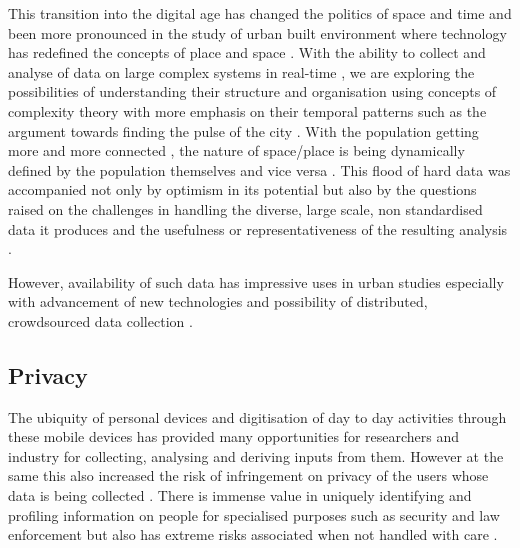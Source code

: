 This transition into the digital age \citep{graham1999, tranos2012, tranos2013} has changed the politics of space and time \citep{massey1992} and been more pronounced in the study of urban built environment where technology has redefined the concepts of place and space \citep{graham2001, graham2002, sassen2001}.
With the ability to collect and analyse of data on large complex systems in real-time \citep{graham1997}, we are exploring the possibilities of understanding their structure and organisation using concepts of complexity theory \citep{bettencourt2013, portugali2012} with more emphasis on their temporal patterns such as the argument towards finding the pulse of the city \citep{batty2010}.
With the population getting more and more connected \citep{castells2010}, the nature of space/place is being dynamically defined by the population themselves \citep{giuliano1991} and vice versa \citep{zandvliet2006}.
This flood of hard data \cite{nature2008} was accompanied not only by optimism in its potential \citep{thomas2001} but also by the questions raised on the challenges in handling the diverse, large scale, non standardised data it produces and the usefulness or representativeness of the resulting analysis \citep{miller2010, arribas-bel2014a}.

However, availability of such data has impressive uses in urban studies \citep{bettencourt2014} especially with advancement of new technologies \citep{steenbruggen2015} and possibility of distributed, crowdsourced data collection \citep{lokanathan2015}.

\subsection{Privacy}

The ubiquity of personal devices and digitisation of day to day activities through these mobile devices \citep{mcmeel2018dark} has provided many opportunities for researchers and industry for collecting, analysing and deriving inputs from them.
However at the same this also increased the risk of infringement on privacy of the users whose data is being collected \cite{saponas2007, krumm2009}.
There is immense value in uniquely identifying and profiling information on people for specialised purposes such as security \citep{cutter2006} and law enforcement \citep{dobson2003} but also has extreme risks associated when not handled with care \citep{vanwey2005}.

